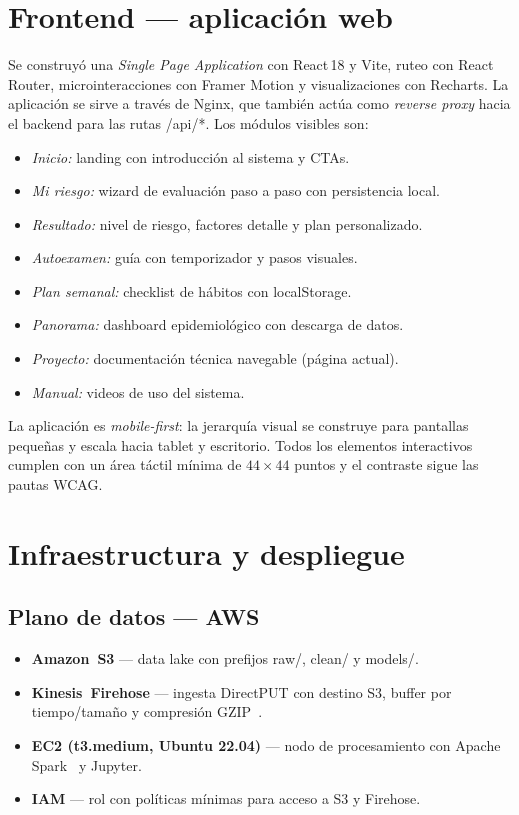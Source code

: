 \documentclass[conference,a4paper,10pt]{IEEEtran}
\newcommand{\code}[1]{{\ttfamily\small\textcolor{hai-primary-dark}{#1}}}
\begin{document}
\section{Frontend --- aplicación web}\label{sec:frontend}
Se construyó una \emph{Single Page Application} con React\,18 y Vite,
ruteo con React Router, microinteracciones con Framer Motion y
visualizaciones con Recharts. La aplicación se sirve a través de Nginx,
que también actúa como \emph{reverse proxy} hacia el backend para las
rutas \code{/api/*}. Los módulos visibles son:
\begin{itemize}[leftmargin=*,nosep]
  \item \emph{Inicio:} landing con introducción al sistema y CTAs.
  \item \emph{Mi riesgo:} wizard de evaluación paso a paso con persistencia local.
  \item \emph{Resultado:} nivel de riesgo, factores detalle y plan personalizado.
  \item \emph{Autoexamen:} guía con temporizador y pasos visuales.
  \item \emph{Plan semanal:} checklist de hábitos con \code{localStorage}.
  \item \emph{Panorama:} dashboard epidemiológico con descarga de datos.
  \item \emph{Proyecto:} documentación técnica navegable (página actual).
  \item \emph{Manual:} videos de uso del sistema.
\end{itemize}
La aplicación es \emph{mobile-first}: la jerarquía visual se construye
para pantallas pequeñas y escala hacia tablet y escritorio. Todos los
elementos interactivos cumplen con un área táctil mínima de
$44\times 44$ puntos y el contraste sigue las pautas WCAG.

\section{Infraestructura y despliegue}\label{sec:deploy}

\subsection{Plano de datos --- AWS}
\begin{itemize}[leftmargin=*,nosep]
  \item \textbf{Amazon~S3} --- data lake con prefijos \code{raw/}, \code{clean/} y \code{models/}.
  \item \textbf{Kinesis~Firehose} --- ingesta DirectPUT con destino S3, buffer por tiempo/tamaño y compresión GZIP~\cite{firehose}.
  \item \textbf{EC2 (t3.medium, Ubuntu 22.04)} --- nodo de procesamiento con Apache Spark~\cite{spark} y Jupyter.
  \item \textbf{IAM} --- rol con políticas mínimas para acceso a S3 y Firehose.
\end{itemize}
\end{document}
